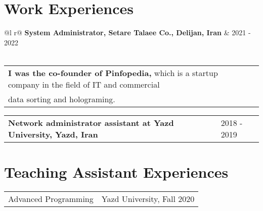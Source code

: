 \documentclass[letter,12pt]{article}
\begin{document}
\section{Work Experiences}

\begin{tabularx}{\linewidth}{ @{}l r@{} }
\textbf{System Administrator, Setare Talaee Co., Delijan, Iran} & \hfill 2021 - 2022 \\[1pt]
 \\
\end{tabularx}
\vspace{-0.1cm}

\begin{tabularx}{\linewidth}{ @{}l r@{} }
\textbf{I was the co-founder of Pinfopedia,} which is a startup company in the field of IT and commercial \\
data sorting and holograming. \\
\end{tabularx}
\vspace{-0.3cm}

\begin{tabularx}{\linewidth}{ @{}l X@{} }
\textbf{Network administrator assistant at Yazd University, Yazd, Iran} & \hfill 2018 - 2019 \\
\end{tabularx}



\vspace{-0.2cm}

\section{Teaching Assistant Experiences}

\begin{tabularx}{\linewidth}{ @{}l X@{} }
Advanced Programming & \hfill Yazd University, Fall 2020 \\[0pt]
\end{tabularx}
\vspace{-0.7cm}
\end{document}
